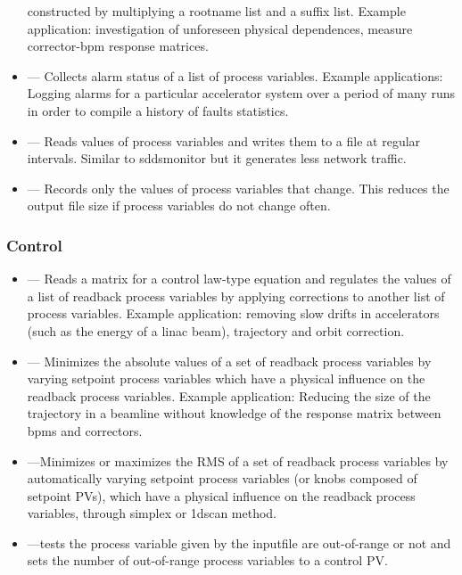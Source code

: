 \documentclass[11pt]{article}
\begin{document}
\begin{itemize}
        constructed by multiplying a rootname list and a suffix list.  Example
        application: investigation of unforeseen physical dependences, measure
        corrector-bpm response matrices.
\item {} --- Collects alarm status of a list of process variables.
        Example applications: Logging alarms for a particular accelerator system over a period of
        many runs in order to compile a history of faults statistics.
\item {} --- Reads values of process variables and writes them to a file at regular intervals. Similar to sddsmonitor but it generates less network traffic.
\item {} --- Records only the values of process variables that change. This reduces the output file size if process variables do not change often.
\end{itemize}

\subsubsection{Control}
\begin{itemize}
\item {} --- Reads a matrix for a control law-type equation and regulates the
values of a list of readback process variables by applying corrections to another list of process variables.
        Example application: removing slow drifts in accelerators (such as the energy of a linac beam), trajectory
        and orbit correction.
\item {} --- Minimizes the absolute values of a set of readback process variables
        by varying setpoint process variables which have a physical influence on the readback process variables.
        Example application: Reducing the size of the trajectory in a beamline without knowledge of the
        response matrix between bpms and correctors.
\item {} ---Minimizes or maximizes the RMS of a set of readback process variables by automatically varying setpoint process variables (or knobs composed of setpoint PVs), which have a physical influence on the readback process variables, through simplex or 1dscan method.
\item {} ---tests the process variable given by the inputfile are out-of-range or not and sets the number of out-of-range process variables to a control PV.
\end{itemize}
\end{document}
